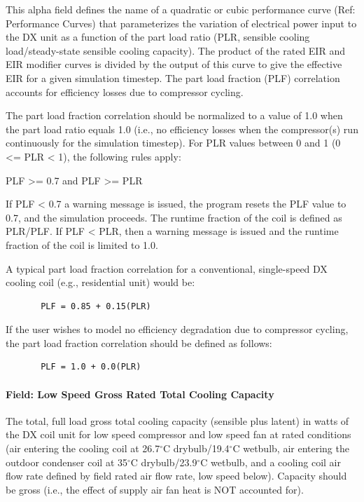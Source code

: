 This alpha field defines the name of a quadratic or cubic performance curve (Ref: Performance Curves) that parameterizes the variation of electrical power input to the DX unit as a function of the part load ratio (PLR, sensible cooling load/steady-state sensible cooling capacity). The product of the rated EIR and EIR modifier curves is divided by the output of this curve to give the effective EIR for a given simulation timestep. The part load fraction (PLF) correlation accounts for efficiency losses due to compressor cycling.

The part load fraction correlation should be normalized to a value of 1.0 when the part load ratio equals 1.0 (i.e., no efficiency losses when the compressor(s) run continuously for the simulation timestep). For PLR values between 0 and 1 (0 \textless{}= PLR \textless{} 1), the following rules apply:

PLF \textgreater{}= 0.7 and PLF \textgreater{}= PLR

If PLF \textless{} 0.7 a warning message is issued, the program resets the PLF value to 0.7, and the simulation proceeds. The runtime fraction of the coil is defined as PLR/PLF. If PLF \textless{} PLR, then a warning message is issued and the runtime fraction of the coil is limited to 1.0.

A typical part load fraction correlation for a conventional, single-speed DX cooling coil (e.g., residential unit) would be:

\begin{lstlisting}
       PLF = 0.85 + 0.15(PLR)
\end{lstlisting}

If the user wishes to model no efficiency degradation due to compressor cycling, the part load fraction correlation should be defined as follows:

\begin{lstlisting}
       PLF = 1.0 + 0.0(PLR)
\end{lstlisting}

\paragraph{Field: Low Speed Gross Rated Total Cooling Capacity}\label{field-low-speed-gross-rated-total-cooling-capacity}

The total, full load gross total cooling capacity (sensible plus latent) in watts of the DX coil unit for low speed compressor and low speed fan at rated conditions (air entering the cooling coil at 26.7$^\circ$C drybulb/19.4$^\circ$C wetbulb, air entering the outdoor condenser coil at 35$^\circ$C drybulb/23.9$^\circ$C wetbulb, and a cooling coil air flow rate defined by field rated air flow rate, low speed below). Capacity should be gross (i.e., the effect of supply air fan heat is NOT accounted for).

